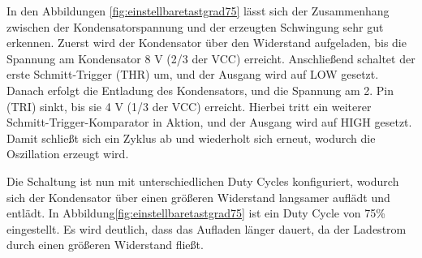 In den Abbildungen \ref{fig:einstellbaretastgrad75} lässt sich der Zusammenhang zwischen der Kondensatorspannung und der erzeugten Schwingung sehr gut erkennen. Zuerst wird der Kondensator über den Widerstand aufgeladen, bis die Spannung am Kondensator 8 V (2/3 der VCC) erreicht. Anschließend schaltet der erste Schmitt-Trigger (THR) um, und der Ausgang wird auf LOW gesetzt. Danach erfolgt die Entladung des Kondensators, und die Spannung am 2. Pin (TRI) sinkt, bis sie 4 V (1/3 der VCC) erreicht. Hierbei tritt ein weiterer Schmitt-Trigger-Komparator in Aktion, und der Ausgang wird auf HIGH gesetzt. Damit schließt sich ein Zyklus ab und wiederholt sich erneut, wodurch die Oszillation erzeugt wird.

Die Schaltung ist nun mit unterschiedlichen Duty Cycles konfiguriert, wodurch sich der Kondensator über einen größeren Widerstand langsamer auflädt und entlädt. In Abbildung\ref{fig:einstellbaretastgrad75}  ist ein Duty Cycle von 75\% eingestellt. Es wird deutlich, dass das Aufladen länger dauert, da der Ladestrom durch einen größeren Widerstand fließt.
%
